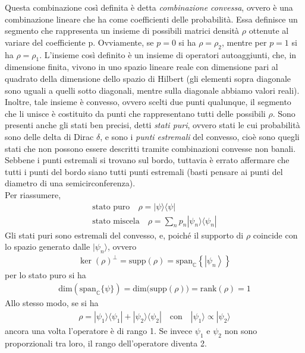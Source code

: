 \begin{itemize}
Questa combinazione così definita è detta \emph{combinazione convessa}, ovvero è una combinazione lineare che ha come coefficienti delle probabilità. Essa definisce un segmento che rappresenta un insieme di possibili matrici densità $\rho$ ottenute al variare del coefficiente p. Ovviamente, se $p=0$ si ha $\rho = \rho_2$, mentre per $p=1$ si ha $\rho=\rho_1$. L'insieme così definito è un insieme di operatori autoaggiunti, che, in dimensione finita, vivono in uno spazio lineare reale con dimensione pari al quadrato della dimensione dello spazio di Hilbert (gli elementi sopra diagonale sono uguali a quelli sotto diagonali, mentre sulla diagonale abbiamo valori reali). Inoltre, tale insieme è convesso, ovvero scelti due punti qualunque, il segmento che li unisce è costituito da punti che rappresentano tutti delle possibili $\rho$. Sono presenti anche gli stati ben precisi, detti \emph{stati puri}, ovvero stati le cui probabilità sono delle delta di Dirac $\delta$, e sono i \emph{punti estremali} del convesso, cioè sono quegli stati che non possono essere descritti tramite combinazioni convesse non banali. Sebbene i punti estremali si trovano sul bordo, tuttavia è errato affermare che tutti i punti del bordo siano tutti punti estremali (basti pensare ai punti del diametro di una semicirconferenza). \\
Per riassumere, 
\begin{equation}\begin{split}
\textrm{stato puro} \quad \rho = |\psi \rangle \langle \psi|  \\
\textrm{stato miscela} \quad \rho = \sum_n{p_n |\psi_n \rangle \langle \psi_n |}
\end{split}\end{equation}
Gli stati puri sono estremali del convesso, e, poiché il supporto di $\rho$ coincide con lo spazio generato dalle $|\psi_n\rangle$, ovvero
\begin{equation}\begin{split}
\ker{\left(\rho\right)^{\perp}}=\textrm{supp}\left(\rho\right)=\textrm{span}_\mathbb{C} \left\{\left |\psi _n \right\rangle\right\}
\end{split}\end{equation}
per lo stato puro si ha
\begin{equation}\begin{split}
\textrm{dim}(\textrm{span}_\mathbb{C}\{\psi\}) = \textrm{dim(supp}(\rho)) = \textrm{rank}(\rho) = 1
\end{split}\end{equation}
Allo stesso modo, se si ha
\begin{equation}\begin{split}
\rho = |\psi_1\rangle\langle\psi_1| +  |\psi_2\rangle\langle\psi_2| \quad \text{con} \quad |\psi_1\rangle \propto |\psi_2 \rangle
\end{split}\end{equation}
ancora una volta l'operatore è di rango 1.
Se invece $\psi_1$ e $\psi_2$ non sono proporzionali tra loro, il rango dell'operatore diventa 2.
\end{itemize}

